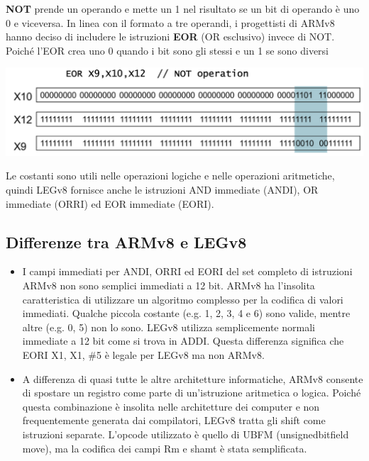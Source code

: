 \documentclass[12pt,a4paper]{article}
\begin{document}
\textbf{NOT} prende un operando e mette un 1 nel risultato se un bit di operando è uno 0 e viceversa. In linea con il formato a tre operandi, i progettisti di ARMv8 hanno deciso di includere le istruzioni \textbf{EOR} (OR esclusivo) invece di NOT. Poiché l'EOR crea uno 0 quando i bit sono gli stessi e un 1 se sono diversi
\begin{center}
\includegraphics[width=0.7\columnwidth]{img/eor.png}
\end{center}
Le costanti sono utili nelle operazioni logiche e nelle operazioni aritmetiche, quindi LEGv8 fornisce anche le istruzioni AND immediate (ANDI), OR immediate (ORRI) ed EOR immediate (EORI).

\subsection{Differenze tra ARMv8 e LEGv8}
\begin{itemize}
\item I campi immediati per ANDI, ORRI ed EORI del set completo di istruzioni ARMv8 non sono semplici immediati a 12 bit. ARMv8 ha l'insolita caratteristica di utilizzare un algoritmo complesso per la codifica di valori immediati. Qualche piccola costante (e.g. 1, 2, 3, 4 e 6) sono valide, mentre altre (e.g. 0, 5) non lo sono. LEGv8 utilizza semplicemente normali immediate a 12 bit come si trova in ADDI. Questa differenza significa che EORI X1, X1, \#5 è legale per LEGv8 ma non ARMv8.
\item A differenza di quasi tutte le altre architetture informatiche, ARMv8 consente di spostare un registro come parte di un'istruzione aritmetica o logica. Poiché questa combinazione è insolita nelle architetture dei computer e non frequentemente generata dai compilatori, LEGv8 tratta gli shift come istruzioni separate. L'opcode utilizzato è quello di UBFM (unsignedbitfield move), ma la codifica dei campi Rm e shamt è stata semplificata.
\end{itemize}
\end{document}
